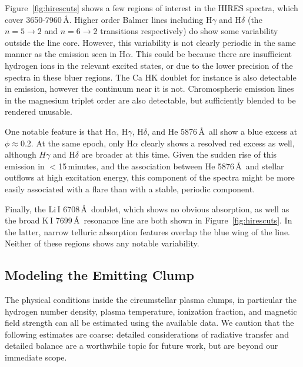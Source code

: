 \documentclass{nature3}
\begin{document}
\begin{methods}
Figure~\ref{fig:hirescuts} shows a few regions of interest in the HIRES
spectra, which cover 3650-7960\,\AA.
Higher order Balmer lines including H$\gamma$ and H$\delta$ (the
$n=5\rightarrow2$ and $n=6\rightarrow2$ transitions respectively) do
show some variability outside the line core.
However, this variability is not clearly periodic in the
same manner as the emission seen in H$\alpha$.
This could be because there are insufficient hydrogen ions in the
relevant excited states, or due to the lower precision of the spectra
in these bluer regions.
The Ca HK doublet for instance is also detectable in emission, however
the continuum near it is not.
Chromospheric emission lines in the magnesium triplet order are
also detectable, but sufficiently blended to be rendered unusable.

One notable feature is that H$\alpha$, H$\gamma$, H$\delta$, and He
5876\,\AA\ all show a blue excess at $\phi$$\approx$0.2.  At the same
epoch, only H$\alpha$ clearly shows a resolved red excess as well,
although $H\gamma$ and H$\delta$ are broader at this time.  Given the
sudden rise of this emission in $<$15\,minutes, and the association
between He 5876\,\AA\ and stellar outflows at high excitation energy,
this component of the spectra might be more easily associated with a
flare than with a stable, periodic component.

Finally, the Li\,\textsc{I} 6708\,\AA\ doublet, which shows no obvious
absorption, as well as the broad K\,\textsc{I} 7699\,\AA\ resonance
line are both shown in Figure~\ref{fig:hirescuts}.  In the latter,
narrow telluric absorption features overlap the blue wing of the line.
Neither of these regions shows any notable variability.


\subsection{Modeling the Emitting Clump}
\label{subsec:model}

The physical conditions inside the circumstellar plasma clumps, in
particular the hydrogen number density, plasma temperature, ionization
fraction, and magnetic field strength can all be estimated using the
available data.
We caution that the following estimates are coarse: detailed
considerations of radiative transfer and detailed balance are a
worthwhile topic for future work, but are beyond our immediate scope.


\end{methods}
\end{document}
